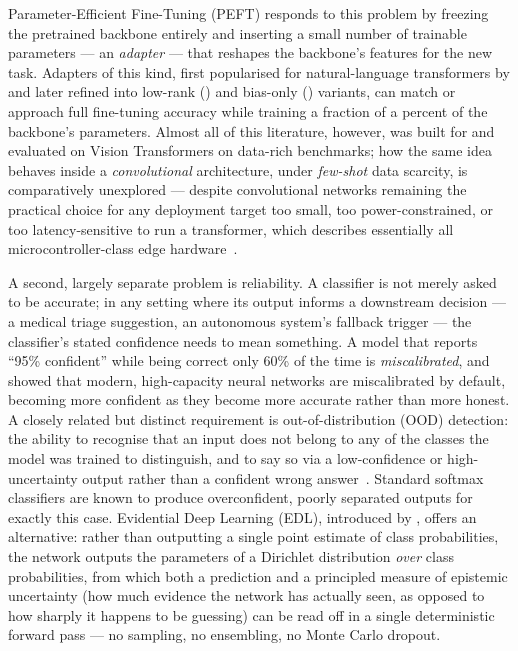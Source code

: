 \documentclass{iutbscthesis}
\begin{document}
Parameter-Efficient Fine-Tuning (PEFT) responds to this problem by freezing the pretrained backbone entirely and inserting a small number of trainable parameters — an \emph{adapter} — that reshapes the backbone's features for the new task. Adapters of this kind, first popularised for natural-language transformers by \textcite{houlsby2019adapters} and later refined into low-rank (\textcite{hu2022lora}) and bias-only (\textcite{benzaken2022bitfit}) variants, can match or approach full fine-tuning accuracy while training a fraction of a percent of the backbone's parameters. Almost all of this literature, however, was built for and evaluated on Vision Transformers on data-rich benchmarks; how the same idea behaves inside a \emph{convolutional} architecture, under \emph{few-shot} data scarcity, is comparatively unexplored — despite convolutional networks remaining the practical choice for any deployment target too small, too power-constrained, or too latency-sensitive to run a transformer, which describes essentially all microcontroller-class edge hardware~\cite{somvanshi2025tinydl}.

A second, largely separate problem is reliability. A classifier is not merely asked to be accurate; in any setting where its output informs a downstream decision — a medical triage suggestion, an autonomous system's fallback trigger — the classifier's stated confidence needs to mean something. A model that reports ``95\% confident'' while being correct only 60\% of the time is \emph{miscalibrated}, and \textcite{guo2017calibration} showed that modern, high-capacity neural networks are miscalibrated by default, becoming more confident as they become more accurate rather than more honest. A closely related but distinct requirement is out-of-distribution (OOD) detection: the ability to recognise that an input does not belong to any of the classes the model was trained to distinguish, and to say so via a low-confidence or high-uncertainty output rather than a confident wrong answer~\cite{hendrycks2017baseline}. Standard softmax classifiers are known to produce overconfident, poorly separated outputs for exactly this case. Evidential Deep Learning (EDL), introduced by \textcite{sensoy2018edl}, offers an alternative: rather than outputting a single point estimate of class probabilities, the network outputs the parameters of a Dirichlet distribution \emph{over} class probabilities, from which both a prediction and a principled measure of epistemic uncertainty (how much evidence the network has actually seen, as opposed to how sharply it happens to be guessing) can be read off in a single deterministic forward pass — no sampling, no ensembling, no Monte Carlo dropout.
\end{document}
